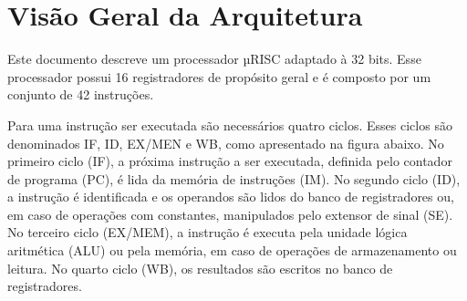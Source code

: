 \documentclass{report}
\begin{document}

\newpage
\section{Visão Geral da Arquitetura}
Este documento descreve um processador µRISC adaptado à 32 bits. Esse processador possui 16 registradores de propósito geral e é composto por um conjunto de 42 instruções. 

Para uma instrução ser executada são necessários quatro ciclos. Esses ciclos são denominados IF, ID, EX/MEN e WB, como apresentado na figura abaixo. No primeiro ciclo (IF),  a próxima instrução a ser executada, definida pelo contador de programa (PC), é lida da memória de instruções (IM). No segundo ciclo (ID), a instrução é identificada e os operandos são lidos do banco de registradores ou, em caso de operações com constantes, manipulados pelo extensor de sinal (SE). No terceiro ciclo (EX/MEM), a instrução é executa pela unidade lógica aritmética (ALU) ou pela memória, em caso de operações de armazenamento ou leitura. No quarto ciclo (WB), os resultados são escritos no banco de registradores.
\end{document}
